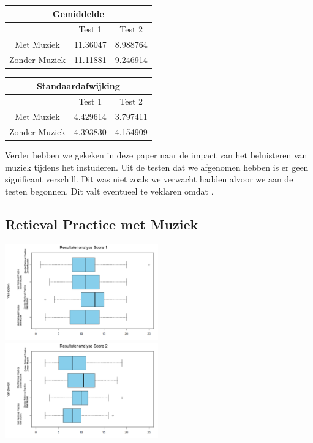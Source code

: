 \documentclass{hogent-article}
\begin{document}
	\begin{tabular}{ |c|c|c| }
	\hline
		\multicolumn{3}{|c|}{Gemiddelde} \\
	\hline
		& Test 1 & Test 2 \\
	\hline
		Met Muziek & 11.36047 & 8.988764 \\
		Zonder Muziek & 11.11881 & 9.246914 \\
	\hline
	\end{tabular}

	\begin{tabular}{ |c|c|c| }
	\hline
		\multicolumn{3}{|c|}{Standaardafwijking} \\
	\hline
		& Test 1 & Test 2 \\
	\hline
		Met Muziek & 4.429614 & 3.797411 \\
		Zonder Muziek & 4.393830 & 4.154909 \\
	\hline
	\end{tabular}

	Verder hebben we gekeken in deze paper naar de impact van het beluisteren van muziek tijdens het instuderen. Uit de testen dat we afgenomen hebben is er geen significant verschill. Dit was niet zoals we verwacht hadden alvoor we aan de testen begonnen. Dit valt eventueel te veklaren omdat . 
	
	\subsection{Retieval Practice met Muziek}
	\includegraphics[width=250px]{Final_boxplots_Score1}
	\includegraphics[width=250px]{Final_boxplots_Score2}
	
\end{document}
